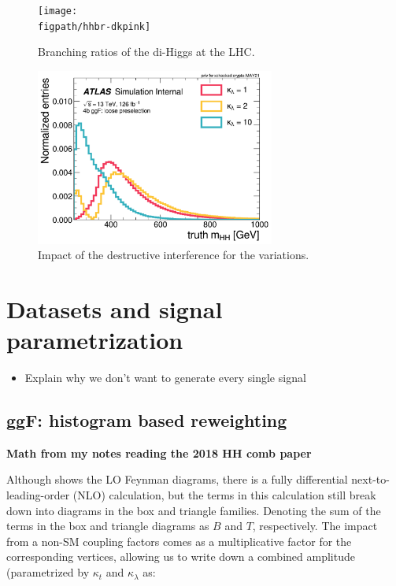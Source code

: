 \begin{figure}
    \centering
    \texttt{[image: \\figpath/hhbr-dkpink]}
    \caption{Branching ratios of the di-Higgs at the LHC.}
    \label{fig:branching-ratios}
\end{figure}

\begin{figure}
    \centering
    \includegraphics[width=0.7\textwidth]{figures/my_dihiggs/truth_mhh_ggf_common_presel.pdf}
    \caption{Impact of the destructive interference for the \kl variations.}
    \label{fig:truth-hh-presel}
\end{figure}


\section{Datasets and signal parametrization}

\begin{itemize}
	\item Explain why we don't want to generate every single signal
\end{itemize}

\subsection{ggF: histogram based reweighting}

\def\Eq{Eq.~{#1}}

\textbf{Math from my notes reading the 2018 HH comb paper}

Although \Fig{\ref{fig:ggF_feyn_dias}} shows the LO Feynman diagrams, there is a fully differential next-to-leading-order (NLO) calculation, but the terms in this calculation still break down into diagrams in the box and triangle families.
Denoting the sum of the terms in the box and triangle diagrams as $B$ and $T$, respectively.
The impact from a non-SM coupling factors comes as a multiplicative factor for the corresponding vertices, allowing us to write down a combined amplitude (parametrized by $\kappa_t$ and $ \kappa_\lambda$ as:

